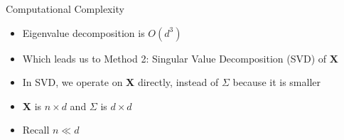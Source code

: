\documentclass[aspectratio=169]{beamer}
\begin{document}
\begin{frame}{Computational Complexity}

\begin{itemize}
\item Eigenvalue decomposition  is $O(d^3)$ 
\item Which leads us to Method 2:  Singular Value Decomposition (SVD) of $\textbf{X}$
\item In SVD, we operate on \textbf{X} directly, instead of $\Sigma$ because it is smaller
\item \textbf{X} is $n \times d$ and $\Sigma$ is $d\times d$
\item Recall $n \ll d$
\end{itemize}
\end{frame}
%
\end{document}
